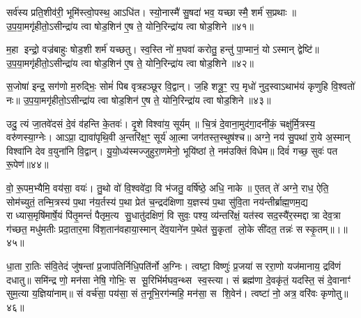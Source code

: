 {\anuvakamend[{असा॑वि स॒प्तविꣳ॑शतिः॥39॥}]}

सर्व॑स्य प्रति॒शीव॑री॒ भूमि॑स्त्वो॒पस्थ॒ आऽधि॑त। स्यो॒नास्मै॑ सु॒षदा॑ भव॒ यच्छास्मै॒ शर्म॑ स॒प्रथाः॥ उ॒प॒या॒मगृ॑हीतो॒ऽसीन्द्रा॑य त्वा षोड॒शिन॑ ए॒ष ते॒ योनि॒रिन्द्रा॑य त्वा षोड॒शिने॥४१॥

{\anuvakamend[{सर्व॑स्य॒ षड्विꣳ॑शतिः॥40॥}]}

म॒हा इन्द्रो॒ वज्र॑बाहुः षोड॒शी शर्म॑ यच्छतु। स्व॒स्ति नो॑ म॒घवा॑ करोतु॒ हन्तु॑ पा॒प्मानं॒ योऽस्मान् द्वेष्टि॑॥ उ॒प॒या॒मगृ॑हीतो॒ऽसीन्द्रा॑य त्वा षोड॒शिन॑ ए॒ष ते॒ योनि॒रिन्द्रा॑य त्वा षोड॒शिने॥४२॥

{\anuvakamend[{सर्व॑स्य म॒हान्थ्षड्विꣳ॑शति॒ष्षड्विꣳ॑शतिः॥41॥}]}

स॒जोषा॑ इन्द्र॒ सग॑णो म॒रुद्भिः॒ सोमं॑ पिब वृत्रहञ्छूर वि॒द्वान्। ज॒हि शत्रू॒ꣳ॒ रप॒ मृधो॑ नुद॒स्वाऽथाभ॑यं कृणुहि वि॒श्वतो॑ नः॥ उ॒प॒या॒मगृ॑हीतो॒ऽसीन्द्रा॑य त्वा षोड॒शिन॑ ए॒ष ते॒ योनि॒रिन्द्रा॑य त्वा षोड॒शिने॥४३॥

{\anuvakamend[{स॒जोषास्त्रि॒ꣳ॒शत्॥42॥}]}

उदु॒ त्यं जा॒तवे॑दसं दे॒वं व॑हन्ति के॒तवः॑। दृ॒शे विश्वा॑य॒ सूर्यम्॥ चि॒त्रं दे॒वाना॒मुद॑गा॒दनी॑कं॒ चक्षु॑र्मि॒त्रस्य॒ वरु॑णस्या॒ग्नेः। आऽप्रा॒ द्यावा॑पृथि॒वी अ॒न्तरि॑क्ष॒ꣳ॒ सूर्य॑ आ॒त्मा जग॑तस्त॒स्थुष॑श्च॥ अग्ने॒ नय॑ सु॒पथा॑ रा॒ये अ॒स्मान् विश्वा॑नि देव व॒युना॑नि वि॒द्वान्। यु॒यो॒ध्य॑स्मज्जुहुरा॒णमेनो॒ भूयि॑ष्ठां ते॒ नम॑उक्तिं विधेम॥ दिवं॑ गच्छ॒ सुवः॑ पत रू॒पेण॑॥४४॥

वो॒ रू॒पम॒भ्यैमि॒ वय॑सा॒ वयः॑। तु॒थो वो॑ वि॒श्ववे॑दा॒ वि भ॑जतु॒ वर्\mbox{}षि॑ष्ठे॒ अधि॒ नाके॥ ए॒तत् ते॑ अग्ने॒ राध॒ ऐति॒ सोम॑च्युतं॒ तन्मि॒त्रस्य॑ प॒था न॑य॒र्तस्य॑ प॒था प्रेत॑ च॒न्द्रद॑क्षिणा य॒ज्ञस्य॑ प॒था सु॑वि॒ता नय॑न्तीर्ब्राह्म॒णम॒द्य राध्यास॒मृषि॑मार्\mbox{}षे॒यं पि॑तृ॒मन्तं॑ पैतृम॒त्य सु॒धातु॑दक्षिणं॒ वि सुवः॒ पश्य॒ व्य॑न्तरि॑क्षं॒ यत॑स्व सद॒स्यै॑र॒स्मद्दात्रा देव॒त्रा ग॑च्छत॒ मधु॑मतीः प्रदा॒तार॒मा वि॑श॒तान॑वहाया॒स्मान् दे॑व॒याने॑न प॒थेत॑ सु॒कृतां लो॒के सी॑दत॒ तन्नः॑ सस्कृ॒तम्॥।॥४५॥

{\anuvakamend[{रू॒पेण॑ सद॒स्यै॑र॒ष्टाद॑श च॥43 (37)॥}]}

धा॒ता रा॒तिः स॑वि॒तेदं जु॑षन्तां प्र॒जाप॑तिर्निधि॒पति॑र्नो अ॒ग्निः। त्वष्टा॒ विष्णुः॑ प्र॒जया॑ सररा॒णो यज॑मानाय॒ द्रवि॑णं दधातु॥ समि॑न्द्र णो॒ मन॑सा नेषि॒ गोभिः॒ स सू॒रिभि॑र्मघव॒न्थ्स स्व॒स्त्या। सं ब्रह्म॑णा दे॒वकृ॑तं॒ यदस्ति॒ सं दे॒वानाꣳ॑ सुम॒त्या य॒ज्ञिया॑नाम्॥ सं वर्च॑सा॒ पय॑सा॒ सं त॒नूभि॒रग॑न्महि॒ मन॑सा॒ स शि॒वेन॑। त्वष्टा॑ नो॒ अत्र॒ वरि॑वः कृणोतु॥४६॥


